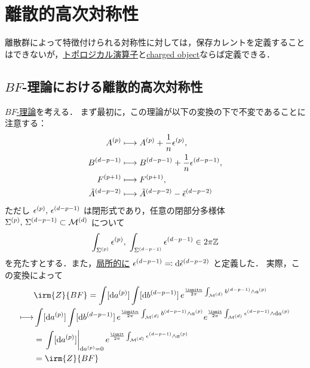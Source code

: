 \documentclass[TQFT_main]{subfiles}
\begin{document}
\section{離散的高次対称性}

離散群によって特徴付けられる対称性に対しては，保存カレントを定義することはできないが，\hyperref[def:p-form-sym]{トポロジカル演算子}と\hyperref[def:p-form-sym]{charged object}ならば定義できる．

\subsection{$BF$-理論における離散的高次対称性}

\hyperref[def:BF]{$BF$-理論}を考える．
まず最初に，この理論が以下の変換の下で不変であることに注意する：
\begin{align}
    A^{(p)} &\longmapsto A^{(p)} + \frac{1}{n} \epsilon^{(p)}, \\
    B^{(d-p-1)} &\longmapsto B^{(d-p-1)} + \frac{1}{n} \epsilon^{(d-p-1)}, \\
    F^{(p+1)} &\longmapsto F^{(p+1)}, \\
    \tilde{A}^{(d-p-2)} &\longmapsto \tilde{A}^{(d-p-2)} - \tilde{\epsilon}^{(d-p-2)}
\end{align}
ただし $\epsilon^{(p)},\, \epsilon^{(d-p-1)}$ は閉形式であり，任意の閉部分多様体 $\Sigma^{(p)},\, \Sigma^{(d-p-1)} \subset \mathcal{M}^{(d)}$ について
\begin{align}
    \int_{\Sigma^{(p)}} \epsilon^{(p)},\; \int_{\Sigma^{(d-p-1)}} \epsilon^{(d-p-1)} \in 2\pi \mathbb{Z}
\end{align}
を充たすとする．また，\underline{局所的に} $\epsilon^{(d-p-1)} \eqqcolon \dd{\tilde{\epsilon}^{(d-p-2)}}$ と定義した．
実際，この変換によって
\begin{align}
    &\irm{Z}{BF} 
    = \int [\dd{\hg{a}{p}}] \int [\dd{\hg{b}{d-p-1}}]\, e^{\frac{\iunit n}{2\pi} \int_{\mfdcal{M}{d}} \hg{b}{d-p-1} \wedge \hg{a}{p}} \\
    \lmto 
    & \int [\dd{\hg{a}{p}}] \int [\dd{\hg{b}{d-p-1}}]\, e^{\frac{\iunit n}{2\pi} \int_{\mfdcal{M}{d}} \hg{b}{d-p-1} \wedge \hg{a}{p}} e^{\frac{\iunit}{2\pi} \int_{\mfdcal{M}{d}} \hg{\epsilon}{d-p-1} \wedge \dd{\hg{a}{p}}} \\
    &= \eval{\int [\dd{\hg{a}{p}}]}_{\dd{\hg{a}{p}} = 0} e^{\frac{\iunit}{2\pi} \int_{\mfdcal{M}{d}} \hg{\epsilon}{d-p-1} \wedge \hg{a}{p}} \\
    &= \irm{Z}{BF} 
\end{align}
\end{document}
